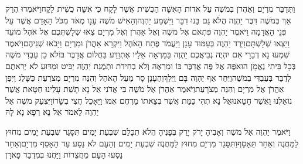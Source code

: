\documentclass[../main/main.tex]{subfiles}
\begin{document}
\begin{multicols}{\ncols}
וַתְּדַבֵּר מִרְיָם וְאַהֲרֹן בְּמֹשֶׁה עַל אֹדוֹת הָאִשָּׁה הַכֻּשִׁית אֲשֶׁר לָקָח כִּי אִשָּׁה כֻשִׁית לָקָח\PreVerseSpace{}וַיֹּאמְרוּ הֲרַק אַךְ בְּמֹשֶׁה דִּבֶּר יַהְוֶה הֲלֹא גַּם בָּנוּ דִבֵּר וַיִּשְׁמַע יַהְוֶה\PreVerseSpace{}וְהָאִישׁ מֹשֶׁה עָנָו מְאֹד מִכֹּל הָאָדָם אֲשֶׁר עַל פְּנֵי הָאֲדָמָה \ClosedSection{}וַיֹּאמֶר יַהְוֶה פִּתְאֹם אֶל מֹשֶׁה וְאֶל אַהֲרֹן וְאֶל מִרְיָם צְאוּ שְׁלָשְׁתְּכֶם אֶל אֹהֶל מוֹעֵד וַיֵּצְאוּ שְׁלָשְׁתָּם\PreVerseSpace{}וַיֵּרֶד יַהְוֶה בְּעַמּוּד עָנָן וַיַּעֲמֹד פֶּתַח הָאֹהֶל וַיִּקְרָא אַהֲרֹן וּמִרְיָם וַיָּבֹאוּ\SubEnd{} שְׁנֵיהֶם\PreVerseSpace{}וַיֹּאמֶר שִׁמְעוּ נָא דְבָרָי אִם יִהְיֶה נְבִיאֲכֶם יַהְוֶה בַּמַּרְאָה אֵלָיו אֶתְוַדָּע בַּחֲלוֹם אֲדַבֶּר בּוֹ\PreVerseSpace{}לֹא כֵן עַבְדִּי מֹשֶׁה בְּכָל בֵּיתִי נֶאֱמָן הוּא\PreVerseSpace{}פֶּה אֶל פֶּה אֲדַבֶּר בּוֹ וּמַרְאֶה וְלֹא בְחִידֹת וּתְמֻנַת יַהְוֶה יַבִּיט וּמַדּוּעַ לֹא יְרֵאתֶם לְדַבֵּר בְּעַבְדִּי בְמֹשֶׁה\PreVerseSpace{}וַיִּחַר אַף יַהְוֶה בָּם וַיֵּלַךְ\PreVerseSpace{}וְהֶעָנָן סָר מֵעַל הָאֹהֶל וְהִנֵּה מִרְיָם מְצֹרַעַת כַּשָּׁלֶג וַיִּפֶן אַהֲרֹן אֶל מִרְיָם וְהִנֵּה מְצֹרָעַת\PreVerseSpace{}וַיֹּאמֶר אַהֲרֹן אֶל מֹשֶׁה בִּי אֲדֹנִי אַל נָא תָשֵׁת עָלֵינוּ חַטָּאת אֲשֶׁר נוֹאַלְנוּ וַאֲשֶׁר חָטָאנוּ\PreVerseSpace{}אַל נָא תְהִי כַּמֵּת אֲשֶׁר בְּצֵאתוֹ מֵרֶחֶם אִמּוֹ וַיֵּאָכֵל חֲצִי בְשָׂרוֹ\PreVerseSpace{}וַיִּצְעַק מֹשֶׁה אֶל יַהְוֶה לֵאמֹר אֵל נָא רְפָא נָא לָהּ\OpenSection{}\par
{}וַיֹּאמֶר יַהְוֶה אֶל מֹשֶׁה וְאָבִיהָ יָרֹק יָרַק בְּפָנֶיהָ הֲלֹא תִכָּלֵם שִׁבְעַת יָמִים תִּסָּגֵר שִׁבְעַת יָמִים מִחוּץ לַמַּחֲנֶה וְאַחַר תֵּאָסֵף\PreVerseSpace{}וַתִּסָּגֵר מִרְיָם מִחוּץ לַמַּחֲנֶה שִׁבְעַת יָמִים וְהָעָם לֹא נָסַע עַד הֵאָסֵף מִרְיָם\PreVerseSpace{}וְאַחַר נָסְעוּ הָעָם מֵחֲצֵרוֹת וַיַּחֲנוּ בְּמִדְבַּר פָּארָן\OpenSection{}\par

\end{multicols}
\end{document}
